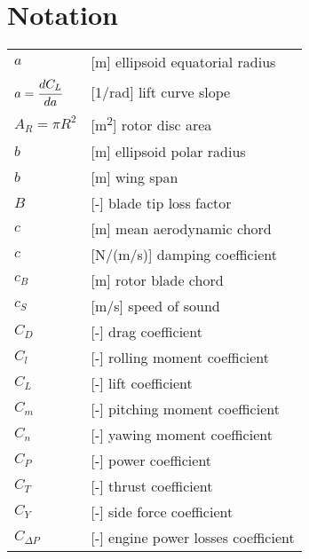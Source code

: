 \clearpage %
{}
\chapter*{Notation}
\markright{}

\begin{longtable}[l]{ l p{} }
  $a$                                          & [m] ellipsoid equatorial radius \\
  $a=\cfrac{dC_L}{da}$                         & [1/rad] lift curve slope \\
  $A_R=\pi R^2$                                & [m\textsuperscript{2}] rotor disc area \\
  $b$                                          & [m] ellipsoid polar radius \\
  $b$                                          & [m] wing span \\
  $B$                                          & [-] blade tip loss factor \\
  $c$                                          & [m] mean aerodynamic chord \\
  $c$                                          & [N/(m/s)] damping coefficient \\
  $c_B$                                        & [m] rotor blade chord \\
  $c_S$                                        & [m/s] speed of sound \\
  $C_D$                                        & [-] drag coefficient \\
  $C_l$                                        & [-] rolling moment coefficient \\
  $C_L$                                        & [-] lift coefficient \\
  $C_m$                                        & [-] pitching moment coefficient \\
  $C_n$                                        & [-] yawing moment coefficient \\
  $C_P$                                        & [-] power coefficient \\
  $C_T$                                        & [-] thrust coefficient \\
  $C_Y$                                        & [-] side force coefficient \\
  $C_{\Delta P}$                               & [-] engine power losses coefficient \\

\end{longtable}
